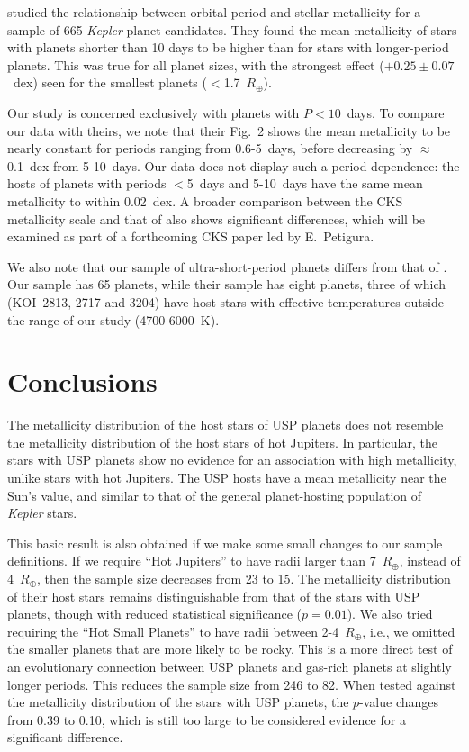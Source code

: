 \documentclass[twocolumn]{aastex6}
\begin{document}
\citet{Mulders+2016} studied the relationship between orbital period
and stellar metallicity for a sample of 665 {\it Kepler} planet
candidates. They found the mean metallicity of stars with planets
shorter than 10 days to be higher than for stars with longer-period
planets.  This was true for all planet sizes, with the strongest
effect ($+0.25\pm 0.07$~dex) seen for the smallest planets
($<$1.7~$R_\oplus$).

Our study is concerned exclusively with planets with $P<10$~days. To
compare our data with theirs, we note that their Fig.~2 shows the mean
metallicity to be nearly constant for periods ranging from 0.6-5~days,
before decreasing by $\approx$0.1~dex from 5-10~days.  Our data does
not display such a period dependence: the hosts of planets with
periods $<$5~days and 5-10~days have the same mean metallicity to
within 0.02~dex. A broader comparison between the CKS metallicity
scale and that of \citet{Mulders+2016} also shows significant
differences, which will be examined as part of a forthcoming CKS paper
led by E.~Petigura.

We also note that our sample of ultra-short-period planets differs
from that of \citet{Mulders+2016}. Our sample has 65 planets, while
their sample has eight planets, three of which (KOI~2813, 2717 and
3204) have host stars with effective temperatures outside the range of
our study (4700-6000~K).

\section{Conclusions}
\label{sec:concl}

The metallicity distribution of the host stars of USP planets does not
resemble the metallicity distribution of the host stars of hot
Jupiters. In particular, the stars with USP planets show no evidence
for an association with high metallicity, unlike stars with hot
Jupiters.  The USP hosts have a mean metallicity near the Sun's value,
and similar to that of the general planet-hosting population of {\it
  Kepler} stars.

This basic result is also obtained if we make some small changes to
our sample definitions.  If we require ``Hot Jupiters'' to have radii
larger than 7~$R_\oplus$, instead of 4~$R_\oplus$, then the sample
size decreases from 23 to 15.  The metallicity distribution of their
host stars remains distinguishable from that of the stars with USP
planets, though with reduced statistical significance ($p=0.01$).  We
also tried requiring the ``Hot Small Planets'' to have radii between
2-4~$R_\oplus$, i.e., we omitted the smaller planets that are more
likely to be rocky. This is a more direct test of an evolutionary
connection between USP planets and gas-rich planets at slightly longer
periods. This reduces the sample size from 246 to 82.  When tested
against the metallicity distribution of the stars with USP planets,
the $p$-value changes from 0.39 to 0.10, which is still too large to
be considered evidence for a significant difference.
\end{document}

